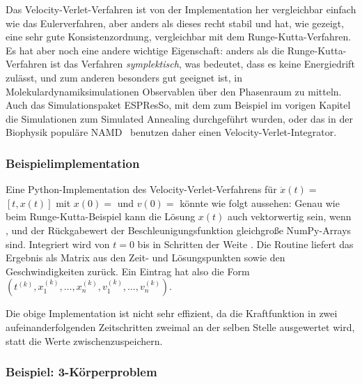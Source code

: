 Das Velocity-Verlet-Verfahren ist von der Implementation her
vergleichbar einfach wie das Eulerverfahren, aber anders als dieses
recht stabil und hat, wie gezeigt, eine sehr gute Konsistenzordnung,
vergleichbar mit dem Runge-Kutta-Verfahren. Es hat aber noch eine
andere wichtige Eigenschaft: anders als die Runge-Kutta-Verfahren ist
das Verfahren \emph{symplektisch}, was bedeutet, dass es keine
Energiedrift zulässt, und zum anderen besonders gut geeignet ist, in
Molekulardynamiksimulationen Observablen über den Phasenraum zu
mitteln.  Auch das Simulationspaket ESPResSo, mit dem zum Beispiel im
vorigen Kapitel die Simulationen zum Simulated Annealing durchgeführt
wurden, oder das in der Biophysik populäre NAMD~\cite{namd} benutzen
daher einen Velocity-Verlet-Integrator.

\subsubsection{Beispielimplementation}

Eine Python-Implementation des Velocity-Verlet-Verfahrens für $\ddot
x(t) = $$[t, x(t)]$ mit $x(0) =$  und $v(0) =$
 könnte wie folgt aussehen:%
%
Genau wie beim Runge-Kutta-Beispiel kann die Lösung $x(t)$ auch
vektorwertig sein, wenn ,  und der Rückgabewert der
Beschleunigungsfunktion  gleichgroße NumPy-Arrays
sind. Integriert wird von $t=0$ bis  in Schritten der Weite
. Die Routine liefert das Ergebnis als Matrix aus den Zeit-
und Lösungspunkten sowie den Geschwindigkeiten zurück. Ein Eintrag hat
also die Form $\left(t^{(k)}, x^{(k)}_1,\ldots,x^{(k)}_n,
v^{(k)}_1,\ldots,v^{(k)}_n\right)$.

Die obige Implementation ist nicht sehr effizient, da die
Kraftfunktion in zwei aufeinanderfolgenden Zeitschritten zweimal an
der selben Stelle ausgewertet wird, statt die Werte
zwischenzuspeichern.

\subsubsection{Beispiel: 3-Körperproblem}

